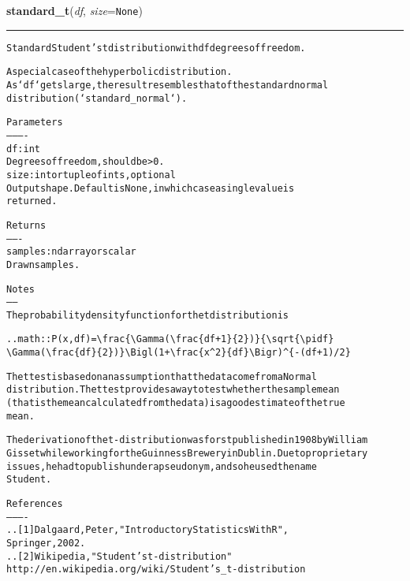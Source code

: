     \label{QSTK:qstklearn:mldiagnostics:standard_t}

    \vspace{0.5ex}

\hspace{.8\funcindent}\begin{boxedminipage}{\funcwidth}

    \raggedright \textbf{standard\_t}(\textit{df}, \textit{size}={\tt None})

    \vspace{-1.5ex}

    \rule{\textwidth}{0.5\fboxrule}
\setlength{\parskip}{2ex}
\begin{alltt}
Standard Student's t distribution with df degrees of freedom.

A special case of the hyperbolic distribution.
As `df` gets large, the result resembles that of the standard normal
distribution (`standard\_normal`).

Parameters
----------
df : int
    Degrees of freedom, should be {\textgreater} 0.
size : int or tuple of ints, optional
    Output shape. Default is None, in which case a single value is
    returned.

Returns
-------
samples : ndarray or scalar
    Drawn samples.

Notes
-----
The probability density function for the t distribution is

.. math:: P(x, df) = {\textbackslash}frac\{{\textbackslash}Gamma({\textbackslash}frac\{df+1\}\{2\})\}\{{\textbackslash}sqrt\{{\textbackslash}pi df\}
          {\textbackslash}Gamma({\textbackslash}frac\{df\}\{2\})\}{\textbackslash}Bigl( 1+{\textbackslash}frac\{x{\textasciicircum}2\}\{df\} {\textbackslash}Bigr){\textasciicircum}\{-(df+1)/2\}

The t test is based on an assumption that the data come from a Normal
distribution. The t test provides a way to test whether the sample mean
(that is the mean calculated from the data) is a good estimate of the true
mean.

The derivation of the t-distribution was forst published in 1908 by William
Gisset while working for the Guinness Brewery in Dublin. Due to proprietary
issues, he had to publish under a pseudonym, and so he used the name
Student.

References
----------
.. [1] Dalgaard, Peter, "Introductory Statistics With R",
       Springer, 2002.
.. [2] Wikipedia, "Student's t-distribution"
       http://en.wikipedia.org/wiki/Student's\_t-distribution


\end{alltt}
\end{boxedminipage}
